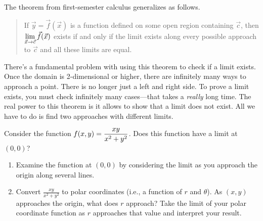 The theorem from first-semester calculus generalizes as follows.
\begin{quote}
 If $\vec y=\vec f(\vec x)$ is a function defined on some open region containing $\vec c$, then $\displaystyle\lim_{\vec x\to \vec c}\vec f(\vec x)$ exists if and only if the limit exists along every possible approach to $\vec c$ and all these limits are equal.
\end{quote}
There's a fundamental problem with using this theorem to check if a limit exists. Once the domain is 2-dimensional or higher, there are infinitely many ways to approach a point. There is no longer just a left and right side. To prove a limit exists, you must check infinitely many cases---that takes a \emph{really} long time.  The real power to this theorem is it allows to show that a limit does not exist.  All we have to do is find two approaches with different limits.



\begin{problem}
%
%
 Consider the function $\displaystyle f(x,y) = \frac{xy}{x^2+y^2}$.  Does this function have a limit at $(0,0)$?  

 \begin{enumerate}
 \item Examine the function at $(0,0)$ by considering the limit as you approach the origin along several lines. 
 \item Convert $\frac{xy}{x^2+y^2}$ to polar coordinates (i.e., a function of $r$ and $\theta$).  As $(x,y)$ approaches the origin, what does $r$ approach?  Take the limit of your polar coordinate function as $r$ approaches that value and interpret your result.
 \end{enumerate}
\end{problem}

